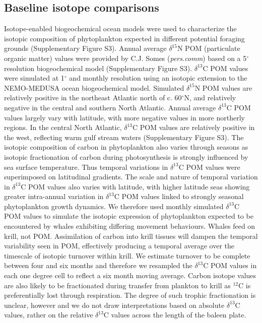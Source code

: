 \documentclass[a4paper,12pt]{article}
\begin{document}
\subsection{Baseline isotope comparisons}
Isotope-enabled biogeochemical ocean models\cite{magozzi2017using,schmittner2016complementary} were used to characterize the isotopic composition of phytoplankton expected in different potential foraging grounds (Supplementary Figure S3). 
Annual average $\delta^{15}$N POM (particulate organic matter) values were provided by C.J. Somes (\textit{pers.comm}) based on a 5$^{\circ}$ resolution biogeochemical model (Supplementary Figure S3). 
$\delta^{13}$C POM values were simulated at 1$^{\circ}$ and monthly resolution using an isotopic extension to the NEMO-MEDUSA ocean biogeochemical model\cite{magozzi2017using,yool2013medusa}. 
Simulated  $\delta^{15}$N POM values are relatively positive in the northeast Atlantic north of c. 60$^{\circ}$N, and relatively negative in the central and southern North Atlantic. 
Annual average $\delta^{13}$C POM values largely vary with latitude, with more negative values in more northerly regions. 
In the central North Atlantic, $\delta^{13}$C POM values are relatively positive in the west, reflecting warm gulf stream waters (Supplementary Figure S3). 
The isotopic composition of carbon in phytoplankton also varies through seasons as isotopic fractionation of carbon during photosynthesis is strongly influenced by sea surface temperature\cite{magozzi2017using,laws1995dependence}.
Thus temporal variations in $\delta^{13}$C POM values were superimposed on latitudinal gradients. 
The scale and nature of temporal variation in $\delta^{13}$C POM values also varies with latitude, with higher latitude seas showing greater intra-annual variation in $\delta^{13}$C POM values linked to strongly seasonal phytoplankton growth dynamics. 
We therefore used monthly simulated $\delta^{13}$C POM values to simulate the isotopic expression of phytoplankton expected to be encountered by whales exhibiting differing movement behaviours.
Whales feed on krill, not POM. 
Assimilation of carbon into krill tissues will dampen the temporal variability seen in POM, effectively producing a temporal average over the timescale of isotopic turnover within krill. 
We estimate turnover to be complete between four and six months and therefore we resampled the $\delta^{13}$C POM values in each one degree cell to reflect a six month moving average. 
Carbon isotope values are also likely to be fractionated during transfer from plankton to krill as $^{12}$C  is preferentially lost through respiration. 
The degree of such trophic fractionation is unclear, however and we do not draw interpretations based on absolute $\delta^{13}$C values, rather on the relative $\delta^{13}$C  values across the length of the baleen plate.
 
\end{document}
